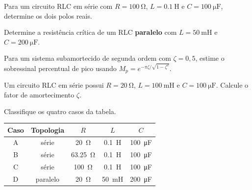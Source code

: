 \begin{questao}[3]{}

Para um circuito RLC em série com $R=\SI{100}{\ohm}$, $L=\SI{0.1}{\henry}$ e
$C=\SI{100}{\micro\farad}$, determine os dois polos reais.


\end{questao}
\begin{questao}[3]{}

Determine a resistência crítica de um RLC \textbf{paralelo} com
$L=\SI{50}{\milli\henry}$ e $C=\SI{200}{\micro\farad}$.


\end{questao}
\begin{questao}[3]{}

Para um sistema subamortecido de segunda ordem com $\zeta=0{,}5$, estime o
sobressinal percentual de pico usando
$M_p=e^{-\pi\zeta/\sqrt{1-\zeta^2}}$.


\end{questao}
\begin{questao}[3]{}

Um circuito RLC em série possui $R=\SI{20}{\ohm}$, $L=\SI{100}{\milli\henry}$ e
$C=\SI{100}{\micro\farad}$. Calcule o fator de amortecimento $\zeta$.


\end{questao}
\begin{questao}[3]{}

Classifique os quatro casos da tabela.

\begin{table}[H]
\centering\small\sffamily
\begin{tabular}{@{}c c c c c@{}}
\toprule
\textbf{Caso} & \textbf{Topologia} & $R$ & $L$ & $C$\\
\midrule
A & série & \SI{20}{\ohm} & \SI{0.1}{\henry} & \SI{100}{\micro\farad}\\
B & série & \SI{63.25}{\ohm} & \SI{0.1}{\henry} & \SI{100}{\micro\farad}\\
C & série & \SI{100}{\ohm} & \SI{0.1}{\henry} & \SI{100}{\micro\farad}\\
D & paralelo & \SI{20}{\ohm} & \SI{50}{\milli\henry} & \SI{200}{\micro\farad}\\
\bottomrule
\end{tabular}
\end{table}


\end{questao}

